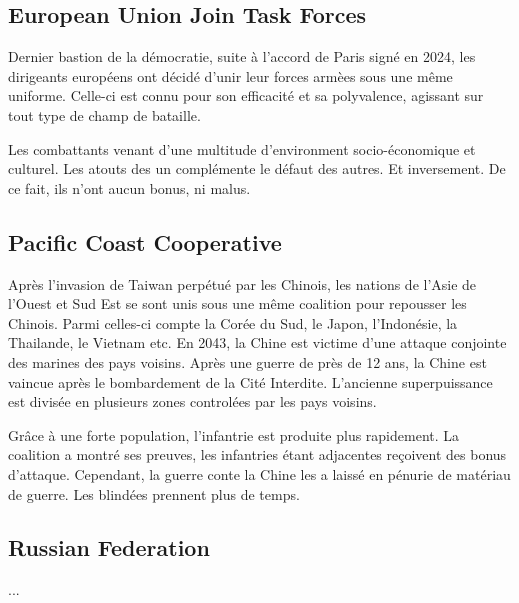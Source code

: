 \documentclass{article}
\begin{document}
\subsection{European Union Join Task Forces}
Dernier bastion de la démocratie, suite à l'accord de Paris signé en 2024, les dirigeants européens ont décidé d'unir
leur forces armèes sous une même uniforme. Celle-ci est connu pour son efficacité et sa polyvalence,
agissant sur tout type de champ de bataille.

Les combattants venant d'une multitude d'environment socio-économique et culturel. Les atouts des un complémente le défaut des autres. 
Et inversement.
De ce fait, ils n'ont aucun bonus, ni malus.

\subsection{Pacific Coast Cooperative}
Après l'invasion de Taiwan perpétué par les Chinois, les nations de l'Asie de l'Ouest et Sud Est se sont unis sous une même coalition pour repousser les Chinois.
Parmi celles-ci compte la Corée du Sud, le Japon, l'Indonésie, la Thailande, le Vietnam etc. En 2043, la Chine est victime d'une
attaque conjointe des marines des pays voisins. Après une guerre de près de 12 ans, la Chine est vaincue après le 
bombardement de la Cité Interdite. L'ancienne superpuissance est divisée en plusieurs
zones controlées par les pays voisins.

Grâce à une forte population, l'infantrie est produite plus rapidement. La coalition a montré ses preuves, les infantries étant adjacentes reçoivent des bonus d'attaque.
Cependant, la guerre conte la Chine les a laissé en pénurie de matériau de guerre. Les blindées prennent plus de temps.

\subsection{Russian Federation}
...
\end{document}
